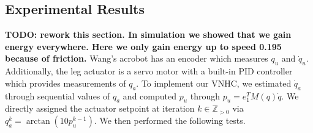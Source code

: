 \documentclass[journal,twoside,web]{ieeecolor}
\begin{document}
\subsection{Experimental Results}

\textbf{TODO: rework this section. In simulation we showed that we gain energy
everywhere. Here we only gain energy up to speed 0.195 because of friction.}
Wang's acrobot has an encoder which measures \(q_u\) and
\(\dot{q}_u\).
Additionally, the leg actuator is a servo motor with a built-in PID controller
which provides measurements of \(q_a\).
To implement our VNHC, we estimated \(\dot{q}_a\) through sequential values of
\(q_a\) and computed \(p_u\) through \(p_u = e_1^T M(q) \dot{q}\).
We directly assigned the actuator setpoint at iteration \(k \in \mathbb{Z}_{> 0}\)
via \(q_a^{k} = \arctan(10 p_u^{k-1})\).
We then performed the following tests.
\end{document}
